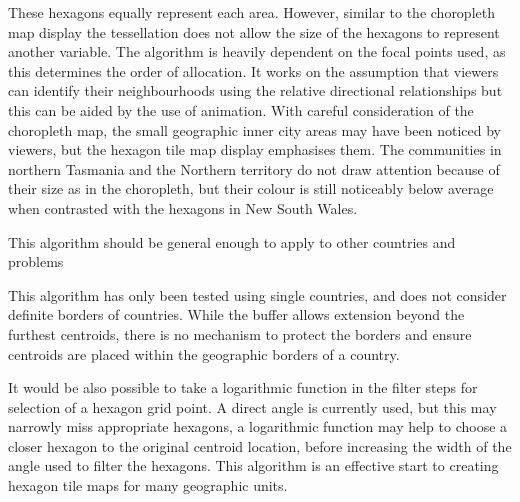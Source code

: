These hexagons equally represent each area. However, similar to the
choropleth map display the tessellation does not allow the size of the
hexagons to represent another variable. The algorithm is heavily
dependent on the focal points used, as this determines the order of
allocation. It works on the assumption that viewers can identify their
neighbourhoods using the relative directional relationships but this can
be aided by the use of animation. With careful consideration of the
choropleth map, the small geographic inner city areas may have been
noticed by viewers, but the hexagon tile map display emphasises them.
The communities in northern Tasmania and the Northern territory do not
draw attention because of their size as in the choropleth, but their
colour is still noticeably below average when contrasted with the
hexagons in New South Wales.

This algorithm should be general enough to apply to other countries and
problems

This algorithm has only been tested using single countries, and does not
consider definite borders of countries. While the buffer allows
extension beyond the furthest centroids, there is no mechanism to
protect the borders and ensure centroids are placed within the
geographic borders of a country.

It would be also possible to take a logarithmic function in the filter
steps for selection of a hexagon grid point. A direct angle is currently
used, but this may narrowly miss appropriate hexagons, a logarithmic
function may help to choose a closer hexagon to the original centroid
location, before increasing the width of the angle used to filter the
hexagons. This algorithm is an effective start to creating hexagon tile
maps for many geographic units.



\address{%
Stephanie Kobakian\\
Monash University\\%
Department of Econometrics and Business Statistics\\
%
%
%
\\\href{mailto:stephanie.kobakian@monash.edu}{\nolinkurl{stephanie.kobakian@monash.edu}}
}

\address{%
Dianne Cook\\
Monash University\\%
Department of Econometrics and Business Statistics\\
%
%
%
\\\href{mailto:dicook@monash.edu}{\nolinkurl{dicook@monash.edu}}
}

\address{%
Earl Duncan\\
Queensland University of Technology\\%
School of Mathematical Sciences\\
%
%
%
\\\href{mailto:earl.duncan@qut.edu.au}{\nolinkurl{earl.duncan@qut.edu.au}}
}
